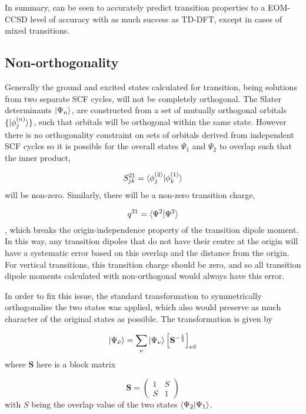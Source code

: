 In summary, \dscf can be seen to accurately predict transition properties
to a EOM-CCSD level of accuracy with as much success as TD-DFT, except in cases
of mixed transitions. 

\subsection{Non-orthogonality}
\label{subsec:dscf_nonorth}
Generally the ground and excited states calculated for \dscf transition, being solutions
from two separate SCF cycles, will not be completely orthogonal. The Slater determinants
$\ket{\Psi_n}$, are constructed from a set of mutually orthogonal orbitals $\{ \ket{\phi_j^{\left(n\right)}} \}$,
such that orbitals will be orthogonal within the same state. However there is no 
orthogonality constraint on sets of orbitals derived from independent SCF cycles
so it is possible for the overall states $\Psi_1$ and $\Psi_2$ to overlap such 
that the inner product,

\begin{equation}
S^{21}_{jk} = \braket{\phi_j^{\left(2\right)} | \phi_k^{\left(1\right)}}
\end{equation}
%
will be non-zero. Similarly, there will be a non-zero transition charge,

\begin{equation}
q^{21} = \braket{\Psi^2|\Psi^2}
\end{equation}
%
, which breaks the origin-independence property of the transition dipole moment. In
this way, any transition dipoles that do not have their centre at the origin will
have a systematic error based on this overlap and the distance from the origin.
For vertical transitions, this transition charge should be zero, and so all transition
dipole moments calculated with non-orthogonal \dscf would always have this error.

In order to fix this issue, the standard transformation to symmetrically orthogonalise 
the two states was applied, which also would preserve as much character of the 
original states as possible. The transformation is given by

\begin{equation}
\ket{\Psi_{\tilde{\nu}}} = \sum_{\nu} \ket{\Psi_\nu} \left[\mathbf{S}^{-\frac{1}{2}} \right]_{\nu\tilde{\nu}}
\end{equation}
%
where $\mathbf{S}$ here is a block matrix

\begin{equation}
\mathbf{S} = \begin{pmatrix}
    1 & S \\
    S & 1 
\end{pmatrix}
\end{equation}
%
with $S$ being the overlap value of the two states $\braket{\Psi_2|\Psi_1}$.

